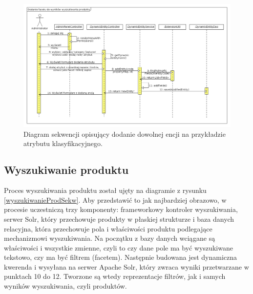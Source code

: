   \begin{figure}
 	\begin{center}
 		\includegraphics[scale=0.38]{dodanieFacetu.png}
 	\end{center}
 	\caption{{\color{black}Diagram sekwencji opisujący dodanie dowolnej encji na przykładzie atrybutu klasyfikacyjnego.}} \label{dodanieFacetu}
 \end{figure}

\subsection{Wyszukiwanie produktu}
Proces wyszukiwania produktu został ujęty na diagramie z rysunku \ref{wyszukiwanieProdSekw}. Aby przedstawić to jak najbardziej obrazowo, w procesie uczestniczą trzy komponenty: frameworkowy kontroler wyszukiwania, serwer Solr, który przechowuje produkty w płaskiej strukturze i baza danych relacyjna, która przechowuje pola i właściwości produktu podlegające mechanizmowi wyszukiwania. Na początku z bazy danych wciągane są właściwości i wszystkie zmienne, czyli to czy dane pole ma być wyszukiwane tekstowo, czy ma być filtrem (facetem). Następnie budowana jest dynamiczna kwerenda i wysyłana na serwer Apache Solr, który zwraca wyniki przetwarzane w punktach 10 do 12. Tworzone są wtedy reprezentacje filtrów, jak i samych wyników wyszukiwania, czyli produktów. 

